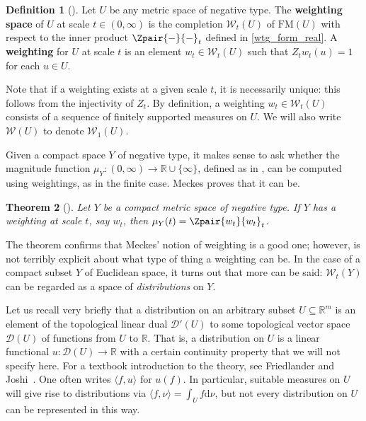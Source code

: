 \documentclass[a4paper, oneside, reqno]{amsart}
\newtheorem{theorem}{Theorem}[section]
\theoremstyle{definition}
\newtheorem{definition}[theorem]{Definition}
\theoremstyle{remark}
\numberwithin{equation}{section}
\newcommand{\R}{\mathbb{R}}
\newcommand{\dd}{\mathrm{d}} %
\newcommand{\finsuppmeas}{\mathrm{FM}}
\newcommand{\wtspace}{\mathcal{W}}
\newcommand{\dispair}[2]{\langle #2,#1 \rangle}
\begin{document}
\begin{definition}[{\cite[Definition~3.3]{Meckes:magnitude-diversity-capacity-dimension}}]
\label{def:weighting-space}
Let \(U\) be any metric space of negative type. The \textbf{weighting space} of \(U\) at scale \(t \in (0, \infty)\) is the completion \(\wtspace_t(U)\) of \(\finsuppmeas(U)\) with respect to the inner product \(\Zpair{-}{-}_t\) defined in \eqref{wtg_form_real}. A \textbf{weighting} for \(U\) at scale \(t\) is an element \(w_t \in \wtspace_t(U)\) such that \(Z_tw_t(u) = 1\) for each \(u \in U\).
\end{definition}

Note that if a weighting exists at a given scale \(t\), it is necessarily unique: this follows from the injectivity of \(Z_t\). By definition, a weighting \(w_t \in \wtspace_t(U)\) consists of a sequence of finitely supported measures on \(U\). We will also write \(\wtspace(U)\) to denote \(\wtspace_1(U)\). 

Given a compact space \(Y\) of negative type, it makes sense to ask whether the magnitude function \(\mu_Y \colon (0, \infty) \to \R \cup \{\infty\}\), defined as in , can be computed using weightings, as in the finite case. Meckes proves that it can be.

\begin{theorem}[{\cite[Theorem~3.4]{Meckes:magnitude-diversity-capacity-dimension}}]
\label{wtg_mag}
Let \(Y\) be a compact metric space of negative type. If \(Y\) has a weighting at scale \(t\), say \(w_t\), then \(\mu_Y(t) = \Zpair{w_t}{w_t}_t\).
\end{theorem}

The theorem confirms that Meckes' notion of weighting is a good one; however,  is not terribly explicit about what type of thing a weighting can be. In the case of a compact subset \(Y\) of Euclidean space, it turns out that more can be said: \(\wtspace_t(Y)\) can be regarded as a space of \emph{distributions} on \(Y\).

Let us recall very briefly that a distribution on an arbitrary subset \(U \subseteq \R^m\) is an element of the topological linear dual \(\mathcal{D}'(U)\) to some topological vector space \(\mathcal{D}(U)\) of functions from \(U\) to \(\R\). That is, a distribution on \(U\) is a linear functional \(u \colon \mathcal{D}(U) \to \R\) with a certain continuity property that we will not specify here. For a textbook introduction to the theory, see Friedlander and Joshi~\cite{Friedlander}. One often writes \(\dispair{u}{f}\) for \(u(f)\). In particular, suitable measures on \(U\) will give rise to distributions via \(\dispair{\nu}{f} = \int_U f \dd \nu\), but not every distribution on \(U\) can be represented in this way.
\end{document}
